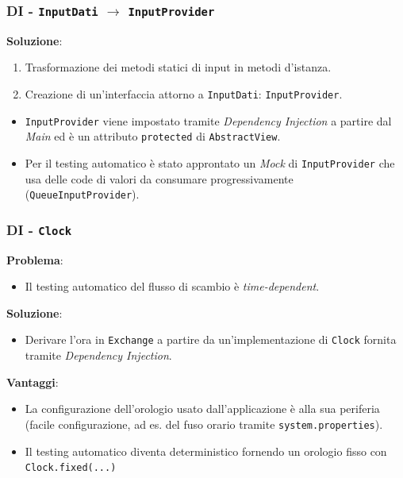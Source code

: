 \begin{frame}
    \frametitle{DI - \texttt{InputDati} $\to$ \texttt{InputProvider}}
    \textbf{Soluzione}:
    \begin{enumerate}
        \item Trasformazione dei metodi statici di input in metodi d'istanza.
        \item Creazione di un'interfaccia attorno a \texttt{InputDati}: \texttt{InputProvider}.
    \end{enumerate}
    \begin{itemize}
        \item \texttt{InputProvider} viene impostato tramite \emph{Dependency Injection} a partire dal \emph{Main}
        ed è un attributo \texttt{protected} di \texttt{AbstractView}.
        \item Per il testing automatico è stato approntato un \emph{Mock} di \texttt{InputProvider} che usa delle code
        di valori da consumare progressivamente (\texttt{QueueInputProvider}).
    \end{itemize}
\end{frame}

\begin{frame}
    \frametitle{DI - \texttt{Clock}}
    \textbf{Problema}:
    \begin{itemize}
        \item Il testing automatico del flusso di scambio è {\color{red}\emph{time-dependent}}.
    \end{itemize}
    \textbf{Soluzione}:
    \begin{itemize}
        \item Derivare l'ora in \texttt{Exchange} a partire da un'implementazione di \texttt{Clock}
        fornita tramite \emph{Dependency Injection}.
    \end{itemize}
    \textbf{Vantaggi}:
    \begin{itemize}
        \item La configurazione dell'orologio usato dall'applicazione è alla sua periferia
        ({\color{green}facile configurazione}, ad es. del fuso orario tramite \texttt{system.properties}).
        \item {\color{green}Il testing automatico diventa deterministico} fornendo un orologio fisso con \texttt{Clock.fixed(...)}
    \end{itemize}
\end{frame}